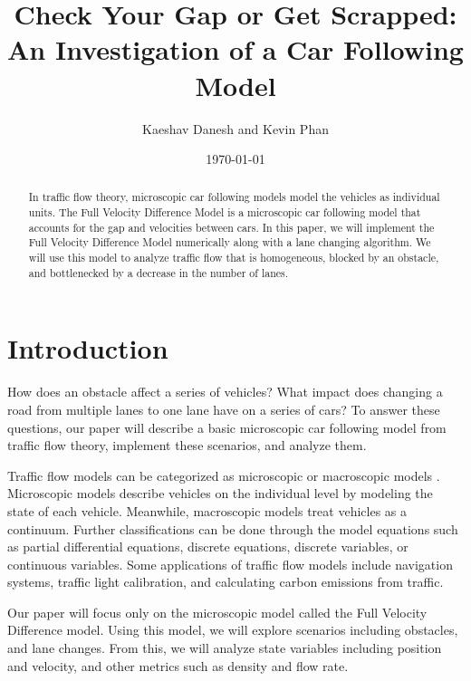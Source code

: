 \documentclass[12pt]{article}
\title{Check Your Gap or Get Scrapped: An Investigation of a Car Following Model}
\author{Kaeshav Danesh and Kevin Phan}
\date{\today}
\begin{document}
    \maketitle

    \begin{abstract}
      In traffic flow theory, microscopic car following models model the vehicles as individual units. The Full Velocity Difference Model is a microscopic car following model that accounts for the gap and velocities between cars. In this paper, we will implement the Full Velocity Difference Model numerically along with a lane changing algorithm. We will use this model to analyze traffic flow that is homogeneous, blocked by an obstacle, and bottlenecked by a decrease in the number of lanes.
    \end{abstract}

    \newpage

    \tableofcontents

    \newpage

    \section{Introduction}
    How does an obstacle affect a series of vehicles? What impact does changing a road from multiple lanes to one lane have on a series of cars? To answer these questions, our paper will describe a basic microscopic car following model from traffic flow theory, implement these scenarios, and analyze them. 

    Traffic flow models can be categorized as microscopic or macroscopic models \cite{hisTraffic}. Microscopic models describe vehicles on the individual level by modeling the state of each vehicle. Meanwhile, macroscopic models treat vehicles as a continuum. Further classifications can be done through the model equations such as partial differential equations, discrete equations, discrete variables, or continuous variables. Some applications of traffic flow models include navigation systems, traffic light calibration, and calculating carbon emissions from traffic. 

    Our paper will focus only on the microscopic model called the Full Velocity Difference model. Using this model, we will explore scenarios including obstacles, and lane changes. From this, we will analyze state variables including position and velocity, and other metrics such as density and flow rate. 
\end{document}
